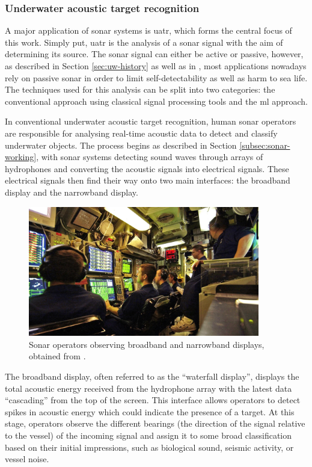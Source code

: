 \subsubsection{Underwater acoustic target recognition}\label{subsubsec:uatr-intro}

A major application of sonar systems is \acrfull{uatr}, which forms the central focus of this work. Simply put, \acrshort{uatr} is the analysis of a sonar signal with the aim of determining its source. The sonar signal can either be active or passive, however, as described in Section \ref{sec:uw-history} as well as in \cite{mishachandar_diverse_2021}, most applications nowadays rely on passive sonar in order to limit self-detectability as well as harm to sea life. The techniques used for this analysis can be split into two categories: the conventional approach using classical signal processing tools and the \acrfull{ml} approach.

In conventional underwater acoustic target recognition, human sonar operators are responsible for analysing real-time acoustic data to detect and classify underwater objects. The process begins as described in Section \ref{subsec:sonar-working}, with sonar systems detecting sound waves through arrays of hydrophones and converting the acoustic signals into electrical signals. These electrical signals then find their way onto two main interfaces: the broadband display and the narrowband display.

\begin{figure}[tbp]
    \centering
    \includegraphics[width=0.9\textwidth]{img/ch2/sonar_operator.png}
    \caption{Sonar operators observing broadband and narrowband displays, obtained from \cite{amick_how_2020}.}
    \label{fig:enter-label}
\end{figure}

The broadband display, often referred to as the ``waterfall display'', displays the total acoustic energy received from the hydrophone array with the latest data ``cascading'' from the top of the screen. This interface allows operators to detect spikes in acoustic energy which could indicate the presence of a target. At this stage, operators observe the different bearings (the direction of the signal relative to the vessel) of the incoming signal and assign it to some broad classification based on their initial impressions, such as biological sound, seismic activity, or vessel noise.

